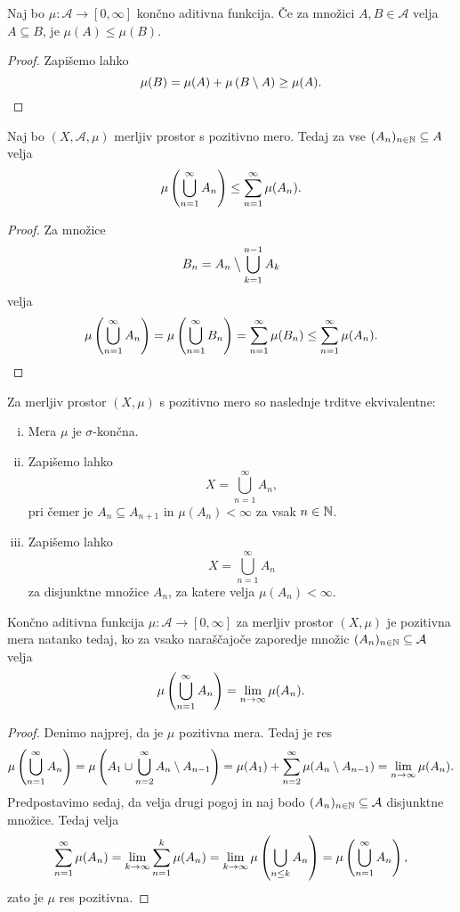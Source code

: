 \begin{lema}
Naj bo $\mu \colon \mathcal{A} \to [0, \infty]$ končno aditivna
funkcija. Če za množici $A, B \in \mathcal{A}$ velja
$A \subseteq B$, je $\mu(A) \leq \mu(B)$.
\end{lema}

\begin{proof}
Zapišemo lahko
\[
\mu(B) = \mu(A) + \mu \left(B \setminus A\right) \geq \mu(A). \qedhere
\]
\end{proof}

\begin{trditev}
Naj bo $(X, \mathcal{A}, \mu)$ merljiv prostor s pozitivno mero.
Tedaj za vse $(A_n)_{n \in \mathbb{N}} \subseteq A$ velja
\[
\mu \left(\bigcup_{n=1}^\infty A_n\right) \leq \sum_{n=1}^\infty \mu(A_n).
\]
\end{trditev}

\begin{proof}
Za množice
\[
B_n = A_n \mathbin{\big\backslash} \bigcup_{k=1}^{n-1} A_k
\]
velja
\[
\mu \left(\bigcup_{n=1}^\infty A_n\right) =
\mu \left(\bigcup_{n=1}^\infty B_n\right) =
\sum_{n=1}^\infty \mu(B_n) \leq
\sum_{n=1}^\infty \mu(A_n). \qedhere
\]
\end{proof}

\begin{trditev}
Za merljiv prostor $(X, \mu)$ s pozitivno mero so naslednje trditve
ekvivalentne:

\begin{enumerate}[i)]
\item Mera $\mu$ je $\sigma$-končna.
\item Zapišemo lahko
\[
X = \bigcup_{n=1}^\infty A_n,
\]
pri čemer je $A_n \subseteq A_{n+1}$ in $\mu(A_n) < \infty$ za vsak
$n \in \mathbb{N}$.
\item Zapišemo lahko
\[
X = \bigcup_{n=1}^\infty A_n
\]
za disjunktne množice $A_n$, za katere velja $\mu(A_n) < \infty$.
\end{enumerate}
\end{trditev}

\obvs

\begin{trditev}
Končno aditivna funkcija $\mu \colon \mathcal{A} \to [0, \infty]$
za merljiv prostor $(X, \mu)$ je pozitivna mera natanko tedaj, ko
za vsako naraščajoče zaporedje množic
$(A_n)_{n \in \mathbb{N}} \subseteq \mathcal{A}$ velja
\[
\mu \left(\bigcup_{n=1}^\infty A_n\right) = \lim_{n \to \infty} \mu(A_n).
\]
\end{trditev}

\begin{proof}
Denimo najprej, da je $\mu$ pozitivna mera. Tedaj je res
\[
\mu \left(\bigcup_{n=1}^\infty A_n\right) =
\mu \left(A_1 \cup \bigcup_{n=2}^\infty A_n \setminus A_{n-1}\right) =
\mu(A_1) + \sum_{n=2}^\infty \mu(A_n \setminus A_{n-1}) =
\lim_{n \to \infty} \mu(A_n).
\]
Predpostavimo sedaj, da velja drugi pogoj in naj bodo
$(A_n)_{n \in \mathbb{N}} \subseteq \mathcal{A}$ disjunktne množice. Tedaj
velja
\[
\sum_{n=1}^\infty \mu(A_n) =
\lim_{k \to \infty} \sum_{n=1}^k \mu(A_n) =
\lim_{k \to \infty} \mu \left(\bigcup_{n \leq k} A_n\right) =
\mu \left(\bigcup_{n=1}^\infty A_n\right),
\]
zato je $\mu$ res pozitivna.
\end{proof}

